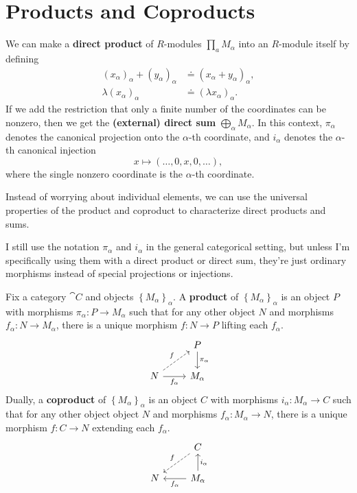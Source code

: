 \documentclass[twoside,10pt]{report}
\begin{document}

\section{Products and Coproducts}

We can make a \textbf{direct product} of $R$-modules $\prod_{a}M_{\alpha}$ into an $R$-module itself by defining
\begin{align*}
	(x_{\alpha})_{\alpha} + (y_{\alpha})_{\alpha} &\doteq (x_{\alpha} + y_{\alpha})_{\alpha}, \\
	\lambda (x_{\alpha})_{\alpha} &\doteq (\lambda x_{\alpha})_{\alpha}.
\end{align*}
If we add the restriction that only a finite number of the coordinates can be nonzero, then we get the \textbf{(external) direct sum} $\bigoplus_{\alpha} M_{\alpha}$. In this context, $\pi_{\alpha}$ denotes the canonical projection onto the $\alpha$-th coordinate, and $i_{\alpha}$ denotes the $\alpha$-th canonical injection
\[
	x \mapsto (\dots, 0, x, 0, \dots),
\] where the single nonzero coordinate is the $\alpha$-th coordinate.

Instead of worrying about individual elements, we can use the universal properties of the product and coproduct to characterize direct products and sums.

\begin{note}[]
I still use the notation $\pi_{\alpha}$ and $i_{\alpha}$ in the general categorical setting, but unless I'm specifically using them with a direct product or direct sum, they're just ordinary morphisms instead of special projections or injections.
\end{note}


\begin{defn}[]
Fix a category $\cat{C}$ and objects $\left\{ M_{\alpha} \right\}_{\alpha}$. A \textbf{product} of $\left\{ M_{\alpha} \right\}_{\alpha}$ is an object $P$ with morphisms $\pi_{\alpha}:P\to M_{\alpha}$ such that for any other object $N$ and morphisms $f_{\alpha}:N\to M_{\alpha}$, there is a unique morphism $f:N\to P$ lifting each $f_{\alpha}$.
\[
\begin{tikzcd}
	& P \dar{\pi_{\alpha}} \\
	N \arrow[ur,dashed,"f"]\rar["f_{\alpha}"'] & M_{\alpha}
\end{tikzcd}
\] 
Dually, a \textbf{coproduct} of $\left\{ M_{\alpha} \right\}_{\alpha}$ is an object $C$ with morphisms $i_{\alpha}:M_{\alpha}\to C$ such that for any other object object $N$ and morphisms $f_{\alpha}:M_{\alpha}\to N$, there is a unique morphism $f:C\to N$ extending each $f_{\alpha}$.
\[
\begin{tikzcd}
	& C \arrow[dl,dashed,"f"'] \\
	N & M_{\alpha} \lar{f_{\alpha}}\uar["i_{\alpha}"']
\end{tikzcd}
\] 
\end{defn}
\end{document}
